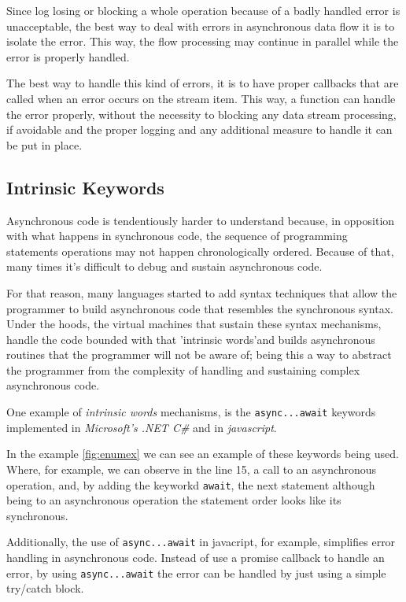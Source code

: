 	Since log losing or blocking a whole operation because of a badly handled error is unacceptable, the best way to deal with errors in asynchronous data flow it is to isolate the error. This way, the flow processing may continue in parallel while the error is properly handled.
	
	The best way to handle this kind of errors, it is to have proper callbacks that are called when an error occurs on the stream item. This way, a function can handle the error properly, without the necessity to blocking any data stream processing, if avoidable and the proper logging and any additional measure to handle it can be put in place.
	\clearpage
	

	\subsection{Intrinsic Keywords} 
	
	Asynchronous code is tendentiously harder to understand because, in opposition with what happens in synchronous code, the sequence of programming statements operations may not happen chronologically ordered. 
	Because of that, many times it's difficult to debug and sustain asynchronous code. 

	For that reason, many languages started to add syntax techniques that allow the programmer to build asynchronous code that resembles the synchronous syntax.
	Under the hoods, the virtual machines that sustain these syntax mechanisms, handle the code bounded with that 'intrinsic words'and builds asynchronous routines that the programmer will not be aware of;
	being this a way to abstract the programmer from the complexity of handling and sustaining complex asynchronous code. 

	One example of \textit{intrinsic words} mechanisms, is the \texttt{async...await} keywords implemented in \textit{Microsoft's .NET C\#} and in \textit{javascript}. 
	
	In the example \ref{fig:enumex} we can see an example of these keywords being used. 
	Where, for example, we can observe in the line 15, a call to an asynchronous operation, and, by adding the keyworkd \texttt{await}, the next statement although being to an asynchronous operation the statement order looks like its synchronous. 
	
	Additionally, the use of \texttt{async...await} in javacript, for example, simplifies error handling in asynchronous code. Instead of use a promise callback to handle an error, by using \texttt{async...await} the error can be handled by just using a simple try/catch block. 
	
